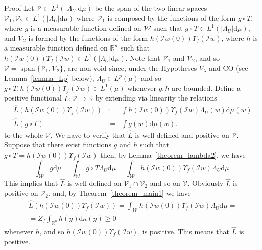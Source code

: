 \documentclass[a4paper,10pt]{article}
\newcommand{\assign}{:=}
\newcommand{\mathd}{\mathrm{d}}
\newcommand{\tmop}[1]{\ensuremath{\operatorname{#1}}}
\newenvironment{proof*}[1]{\noindent\textbf{#1\ }}{\hspace*{\fill}$\Box$\medskip}
\begin{document}
\begin{proof*}{Proof}
  Let $\mathcal{V} \subset L^1 (| \Lambda_U | \mathd \mu)$ be the span of the
  two linear spaces $\mathcal{V}_1, \mathcal{V}_2 \subset L^1 (| \Lambda_U |
  \mathd \mu)$ where $\mathcal{V}_1$ is composed by the functions of the form
  $g \circ T$, where $g$ is a measurable function defined on $\mathcal{W}$
  such that $g \circ T \in L^1 (| \Lambda_U | \mathd \mu)$, and
  $\mathcal{V}_2$ is formed by the functions of the form $h (\mathcal{I}w (0))
  \Upsilon_f (\mathcal{I}w)$, where $h$ is a measurable function defined on
  $\mathbb{R}^n$ such that $h (\mathcal{I}w (0)) \Upsilon_f (\mathcal{I}w) \in
  L^1 (| \Lambda_U | \mathd \mu)$. Note that $\mathcal{V}_1$ and
  $\mathcal{V}_2$, and so $\mathcal{V} = \tmop{span} \{ \mathcal{V}_1,
  \mathcal{V}_2 \}$, are non-void since, under the Hypotheses $V_{\lambda}$
  and CO (see Lemma~\ref{lemma_Lp} below), $\Lambda_U \in L^p (\mu)$ and so $g
  \circ T, h (\mathcal{I}w (0)) \Upsilon_f (\mathcal{I}w) \in L^1 (\mu)$
  whenever $g, h$ are bounded. Define a positive functional $\hat{L} :
  \mathcal{V} \rightarrow \mathbb{R}$ by extending via linearity the relations
  \begin{eqnarray}
    \hat{L} (h (\mathcal{I}w (0)) \Upsilon_f (\mathcal{I}w)) & \assign & \int
    h (\mathcal{I}w (0)) \Upsilon_f (\mathcal{I}w) \Lambda_U (w) \mathd \mu
    (w) \label{equationreduction2} \\
    \hat{L} (g \circ T) & \assign & \int g (w) \mathd \mu (w) .
    \label{equationreduction1} 
  \end{eqnarray}
  to the whole $\mathcal{V}$. We have to verify that $\hat{L}$ is well defined
  and positive on $\mathcal{V} .$ Suppose that there exist functions $g$ and
  $h$ such that $g \circ T = h (\mathcal{I}w (0)) \Upsilon_f (\mathcal{I}w)$
  then, by Lemma~\ref{theorem_lambda2}, we have
  \begin{equation}
    \int_{\mathcal{W}} g \mathd \mu = \int_{\mathcal{W}} g \circ T \Lambda_U
    \mathd \mu = \int_{\mathcal{W}} h (\mathcal{I}w (0)) \Upsilon_f
    (\mathcal{I}w) \Lambda_U \mathd \mu . \label{equationreduction4}
  \end{equation}
  This implies that $\hat{L}$ is well defined on $\mathcal{V}_1 \cap
  \mathcal{V}_2$ and so on $\mathcal{V}$. Obviously $\hat{L}$ is positive on
  $\mathcal{V}_2$, and, by Theorem~\ref{theorem_main1} we have
  \begin{equation}
    \begin{array}{c}
      \hat{L} (h (\mathcal{I}w (0)) \Upsilon_f (\mathcal{I}w)) =
      \int_{\mathcal{W}} h (\mathcal{I}w (0)) \Upsilon_f (\mathcal{I}w)
      \Lambda_U \mathd \mu =\\
      = Z_f \int_{\mathbb{R}^n} h (y) \mathd \kappa (y) \geqslant 0
    \end{array} \label{equationreduction3}
  \end{equation}
  whenever $h$, and so $h (\mathcal{I}w (0)) \Upsilon_f (\mathcal{I}w)$, is
  positive. This means that $\hat{L}$ is positive.
  

\end{proof*}
\end{document}
